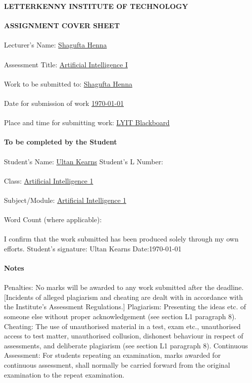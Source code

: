 \textbf{LETTERKENNY INSTITUTE OF TECHNOLOGY}
\\
\\
\textbf{ASSIGNMENT COVER SHEET}
\\
\\
Lecturer’s Name: \underline{Shagufta Henna}
\\
\\
Assessment Title:  \underline{Artificial Intelligence I}
\\
\\
Work to be submitted to:   \underline{Shagufta Henna}	
\\
\\
Date for submission of work   \underline{\today}
\\
\\
Place and time for submitting work:  \underline{LYIT Blackboard}          	
\\
\\
\textbf{To be completed by the Student}
\\
\\
Student’s Name: \underline{Ultan Kearns}                        	      Student’s L Number: 
\\
\\
Class: \underline{Artificial Intelligence 1}
\\
\\
Subject/Module: \underline{Artificial Intelligence 1}
\\
\\
Word Count (where applicable):
\\
\\
I confirm that the work submitted has been produced solely through my own efforts. 
Student’s signature: Ultan Kearns                                       Date:\today   
\\
\\
\textbf{Notes}
\\
\\
Penalties:  No marks will be awarded to any work submitted after the deadline.  [Incidents of alleged plagiarism and cheating are dealt with in accordance with the Institute’s Assessment Regulations.]
Plagiarism:  Presenting the ideas etc. of someone else without proper acknowledgement (see section L1 paragraph 8). 
Cheating:  The use of unauthorised material in a test, exam etc., unauthorised access to test matter, unauthorised collusion, dishonest behaviour in respect of assessments, and deliberate plagiarism (see section L1 paragraph 8).
Continuous Assessment:  For students repeating an examination, marks awarded for continuous assessment, shall normally be carried forward from the original examination to the repeat examination.

\clearpage
\newpage
